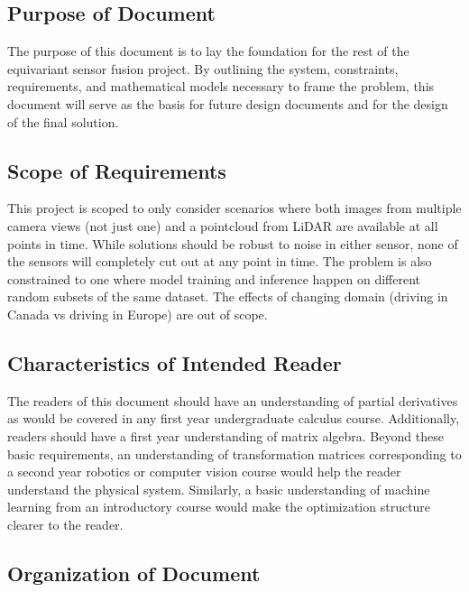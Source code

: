 \documentclass[12pt]{article}
\begin{document}
\subsection{Purpose of Document}

The purpose of this document is to lay the foundation for the rest of the equivariant 
sensor fusion project. By outlining the system, constraints, requirements, and mathematical
models necessary to frame the problem, this document will serve as the basis for future design
documents and for the design of the final solution.

\subsection{Scope of Requirements} 

This project is scoped to only consider scenarios where both images from multiple camera views (not just one)
and a pointcloud from LiDAR are available at all points in time. While solutions should be robust
to noise in either sensor, none of the sensors will completely cut out at any point in time.
The problem is also constrained to one where model training and inference happen on different random subsets
of the same dataset. The effects of changing domain (driving in Canada vs driving in Europe) are out of scope.

\subsection{Characteristics of Intended Reader} \label{sec_IntendedReader}

The readers of this document should have an understanding of partial derivatives as 
would be covered in any first year undergraduate calculus course. Additionally,
readers should have a first year understanding of matrix algebra. Beyond these basic 
requirements, an understanding of transformation matrices corresponding to a second year 
robotics or computer vision course would help the reader understand the physical system. 
Similarly, a basic understanding of machine learning from an introductory course would 
make the optimization structure clearer to the reader. 

\subsection{Organization of Document}
\end{document}
